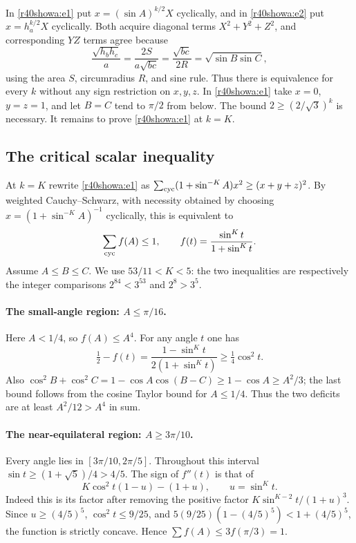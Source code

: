 \documentclass[11pt,a4paper]{article}
\numberwithin{equation}{section}
\theoremstyle{definition}
\theoremstyle{remark}
\begin{document}
In \eqref{r40showa:e1} put $x=(\sin A)^{k/2}X$ cyclically, and in
\eqref{r40showa:e2} put $x=h_a^{k/2}X$ cyclically. Both acquire diagonal terms $X^2+Y^2+Z^2$, and corresponding $YZ$ terms agree because
\[
 \frac{\sqrt{h_bh_c}}{a}
 =\frac{2S}{a\sqrt{bc}}=\frac{\sqrt{bc}}{2R}
 =\sqrt{\sin B\sin C},
\]
using the area $S$, circumradius $R$, and sine rule. Thus there is equivalence for every $k$ without any sign restriction on $x,y,z$. In \eqref{r40showa:e1} take $x=0$, $y=z=1$, and let $B=C$ tend to $\pi/2$ from below. The bound $2\ge(2/\sqrt3)^k$ is necessary. It remains to prove \eqref{r40showa:e1} at $k=K$.

\subsection{The critical scalar inequality}
At $k=K$ rewrite \eqref{r40showa:e1} as $\sum_{\rm cyc}(1+\sin^{-K}A)x^2\ge (x+y+z)^2$. By weighted Cauchy--Schwarz, with necessity obtained by choosing $x=(1+\sin^{-K}A)^{-1}$ cyclically, this is equivalent to
\[
 \sum_{\rm cyc} f(A)\le 1,\qquad f(t)=\frac{\sin^Kt}{1+\sin^Kt}.
\]
Assume $A\le B\le C$. We use $53/11<K<5$: the two inequalities are respectively the integer comparisons $2^{84}<3^{53}$ and $2^8>3^5$.

\paragraph{The small-angle region: $A\le\pi/16$.}
Here $A<1/4$, so $f(A)\le A^4$. For any angle $t$ one has
\[
 \tfrac12-f(t)=\frac{1-\sin^Kt}{2(1+\sin^Kt)}
 \ge \tfrac14\cos^2t.
\]
Also $\cos^2B+\cos^2C=1-\cos A\cos(B-C)\ge1-\cos A\ge A^2/3$; the last bound follows from the cosine Taylor bound for $A\le1/4$. Thus the two deficits are at least $A^2/12>A^4$ in sum.

\paragraph{The near-equilateral region: $A\ge3\pi/10$.}
Every angle lies in $[3\pi/10,2\pi/5]$. Throughout this interval $\sin t\ge (1+\sqrt5)/4>4/5$. The sign of $f''(t)$ is that of
\[
 K\cos^2t(1-u)-(1+u),\qquad u=\sin^K t .
\]
Indeed this is its factor after removing the positive factor $K\sin^{K-2}t/(1+u)^3$. Since $u\ge(4/5)^5$, $\cos^2t\le9/25$, and
$5(9/25)(1-(4/5)^5)<1+(4/5)^5$, the function is strictly concave. Hence $\sum f(A)\le3f(\pi/3)=1$.
\end{document}
